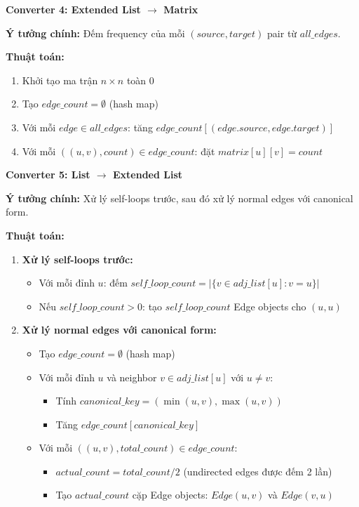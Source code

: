 \documentclass[12pt,a4paper]{article}
\begin{document}
\vspace{0.5cm}

\textbf{Converter 4: Extended List $\rightarrow$ Matrix}

\textbf{Ý tưởng chính:} Đếm frequency của mỗi $(source, target)$ pair từ $all\_edges$.

\textbf{Thuật toán:}
\begin{enumerate}
    \item Khởi tạo ma trận $n \times n$ toàn $0$
    \item Tạo $edge\_count = \emptyset$ (hash map)
    \item Với mỗi $edge \in all\_edges$: tăng $edge\_count[(edge.source, edge.target)]$
    \item Với mỗi $((u,v), count) \in edge\_count$: đặt $matrix[u][v] = count$
\end{enumerate}


\vspace{0.5cm}

\textbf{Converter 5: List $\rightarrow$ Extended List}

\textbf{Ý tưởng chính:} Xử lý self-loops trước, sau đó xử lý normal edges với canonical form.

\textbf{Thuật toán:}
\begin{enumerate}
    \item \textbf{Xử lý self-loops trước:}
    \begin{itemize}
        \item Với mỗi đỉnh $u$: đếm $self\_loop\_count = |\{v \in adj\_list[u] : v = u\}|$
        \item Nếu $self\_loop\_count > 0$: tạo $self\_loop\_count$ Edge objects cho $(u,u)$
    \end{itemize}
    \item \textbf{Xử lý normal edges với canonical form:}
    \begin{itemize}
        \item Tạo $edge\_count = \emptyset$ (hash map)
        \item Với mỗi đỉnh $u$ và neighbor $v \in adj\_list[u]$ với $u \neq v$:
        \begin{itemize}
            \item Tính $canonical\_key = (\min(u,v), \max(u,v))$
            \item Tăng $edge\_count[canonical\_key]$
        \end{itemize}
        \item Với mỗi $((u,v), total\_count) \in edge\_count$:
        \begin{itemize}
            \item $actual\_count = total\_count / 2$ (undirected edges được đếm 2 lần)
            \item Tạo $actual\_count$ cặp Edge objects: $Edge(u,v)$ và $Edge(v,u)$
        \end{itemize}
    \end{itemize}
\end{enumerate}
\end{document}

